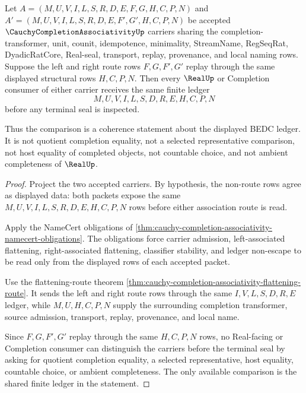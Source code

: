 \begin{theorem}
\label{thm:cauchy-completion-associativity-two-route-coherence}
Let $A=(M,U,V,I,L,S,R,D,E,F,G,H,C,P,N)$ and $A'=(M,U,V,I,L,S,R,D,E,F',G',H,C,P,N)$ be accepted $\CauchyCompletionAssociativityUp$ carriers sharing the completion-transformer, unit, counit, idempotence, minimality, StreamName, RegSeqRat, DyadicRatCore, Real-seal, transport, replay, provenance, and local naming rows. Suppose the left and right route rows $F,G,F',G'$ replay through the same displayed structural rows $H,C,P,N$. Then every $\RealUp$ or Completion consumer of either carrier receives the same finite ledger
$$
M,U,V,I,L,S,D,R,E,H,C,P,N
$$
before any terminal seal is inspected.

Thus the comparison is a coherence statement about the displayed BEDC ledger. It is not quotient completion equality, not a selected representative comparison, not host equality of completed objects, not countable choice, and not ambient completeness of $\RealUp$.
\end{theorem}
\begin{proof}
Project the two accepted carriers. By hypothesis, the non-route rows agree as displayed data: both packets expose the same $M,U,V,I,L,S,R,D,E,H,C,P,N$ rows before either association route is read.

Apply the NameCert obligations of \autoref{thm:cauchy-completion-associativity-namecert-obligations}. The obligations force carrier admission, left-associated flattening, right-associated flattening, classifier stability, and ledger non-escape to be read only from the displayed rows of each accepted packet.

Use the flattening-route theorem \autoref{thm:cauchy-completion-associativity-flattening-route}. It sends the left and right route rows through the same $I,V,L,S,D,R,E$ ledger, while $M,U,H,C,P,N$ supply the surrounding completion transformer, source admission, transport, replay, provenance, and local name.

Since $F,G,F',G'$ replay through the same $H,C,P,N$ rows, no Real-facing or Completion consumer can distinguish the carriers before the terminal seal by asking for quotient completion equality, a selected representative, host equality, countable choice, or ambient completeness. The only available comparison is the shared finite ledger in the statement.
\end{proof}

